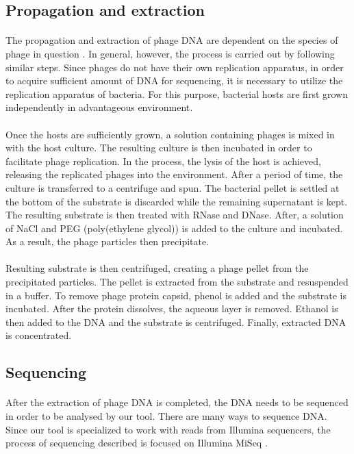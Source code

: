 \subsection{Propagation and extraction}
\paragraph*{}
The propagation and extraction of phage DNA are dependent on the species of phage in question \cite{kleiner2015evaluation}. In general, however, the process is carried out by following similar steps. Since phages do not have their own replication apparatus, in order to acquire sufficient amount of DNA for sequencing, it is necessary to utilize the replication apparatus of bacteria. For this purpose, bacterial hosts are first grown independently in advantageous environment.
\paragraph*{}
Once the hosts are sufficiently grown, a solution containing phages is mixed in with the host culture. The resulting culture is then incubated in order to facilitate phage replication. In the process, the lysis of the host is achieved, releasing the replicated phages into the environment. After a period of time, the culture is transferred to a centrifuge and spun. The bacterial pellet is settled at the bottom of the substrate is discarded while the remaining supernatant is kept. The resulting substrate is then treated with RNase and DNase. After, a solution of NaCl and PEG (poly(ethylene glycol)) is added to the culture and incubated. As a result, the phage particles then precipitate. 
\paragraph*{}
Resulting substrate is then centrifuged, creating a phage pellet from the precipitated particles. The pellet is extracted from the substrate and resuspended in a buffer. To remove phage protein capsid, phenol is added and the substrate is incubated. After the protein dissolves, the aqueous layer is removed. Ethanol is then added to the DNA and the substrate is centrifuged. Finally, extracted DNA is concentrated.

\subsection{Sequencing}
\paragraph*{}
After the extraction of phage DNA is completed, the DNA needs to be sequenced in order to be analysed by our tool. There are many ways to sequence DNA. Since our tool is specialized to work with reads from Illumina sequencers, the process of sequencing described is focused on Illumina MiSeq \cite{ravi2018miseq}.
